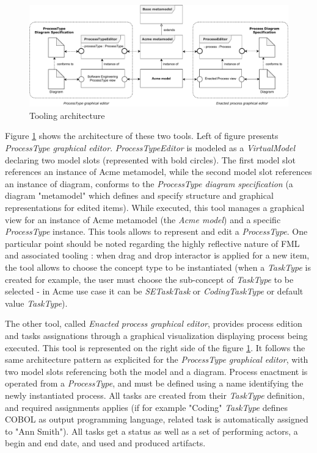 \begin{figure}
 \centering
     \includegraphics[width=0.9 \textwidth]{Figures/ToolingArchitecture.pdf}
     \caption{Tooling architecture}
    \label{fig:ToolingArchitecture}
\end{figure}

Figure \ref{fig:ToolingArchitecture} shows the architecture of these two tools. Left of figure presents \textit{ProcessType graphical editor}. \textit{ProcessTypeEditor} is modeled as a \textit{VirtualModel} declaring two model slots (represented with bold circles). The first model slot references an instance of Acme metamodel, while the second model slot references an instance of diagram, conforms to the \textit{ProcessType diagram specification} (a diagram "metamodel" which defines and specify structure and graphical representations for edited items). While executed, this tool manages a graphical view for an instance of Acme metamodel (the \textit{Acme model}) and a specific \textit{ProcessType} instance. This tools allows to represent and edit a \textit{ProcessType}. One particular point should be noted regarding the highly reflective nature of FML and associated tooling : when drag and drop interactor is applied for a new item, the tool allows to choose the concept type to be instantiated (when a \textit{TaskType} is created for example, the user must choose the sub-concept of \textit{TaskType} to be selected - in Acme use case it can be \textit{SETaskTask} or \textit{CodingTaskType} or default value \textit{TaskType}). 

The other tool, called \textit{Enacted process graphical editor}, provides process edition and tasks assignations through a graphical visualization displaying process being executed. This tool is represented on the right side of the figure \ref{fig:ToolingArchitecture}. It follows the same architecture pattern as explicited for the \textit{ProcessType graphical editor}, with two model slots referencing both the model and a diagram. Process enactment is operated from a \textit{ProcessType}, and must be defined using a name identifying the newly instantiated process. All tasks are created from their \textit{TaskType} definition, and required assignments applies (if for example "Coding" \textit{TaskType} defines COBOL as output programming language, related task is automatically assigned to "Ann Smith"). All tasks get a status as well as a set of performing actors, a begin and end date, and used and produced artifacts. 




